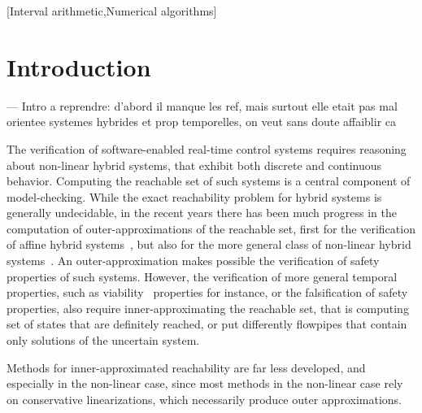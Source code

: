 \documentclass{sig-alternate-05-2015} %
\newcommand\ForAuthors[1]%
 {\par\smallskip                     %
  \begin{center}%
   \fbox%
   {\parbox{0.9\linewidth}%
    {\raggedright\sc--- #1}%
   }%
  \end{center}%
  \par\smallskip                     %
 }
\begin{document}
[Interval arithmetic,Numerical algorithms]\\



\section{Introduction}
%
\ForAuthors{Intro a reprendre: d'abord il manque les ref, mais surtout elle etait pas mal orientee systemes hybrides et prop temporelles, 
on veut sans doute affaiblir ca}
The verification of software-enabled real-time control systems requires reasoning about non-linear hybrid systems, 
that exhibit both discrete and continuous behavior. Computing the reachable set of such systems is a central component 
of model-checking. While the exact reachability problem for hybrid systems is generally undecidable, in the recent 
years there has been much progress in the computation of outer-approximations of the reachable set, first for the 
verification of affine hybrid systems~\cite{}, but also for the more general class of non-linear hybrid systems~\cite{}. 
An outer-approximation makes possible the verification of safety properties of such systems. However, the verification 
of more general temporal properties, such as viability~\cite{} properties for instance, or the falsification of safety properties, 
also require inner-approximating the reachable set, that is computing set of states that are definitely reached, or put differently 
flowpipes that contain only solutions of the uncertain system.
     
Methods for inner-approximated reachability are far less developed, and especially in the non-linear case, 
since most methods in the non-linear case rely on conservative linearizations, which necessarily produce outer approximations.
\end{document}
